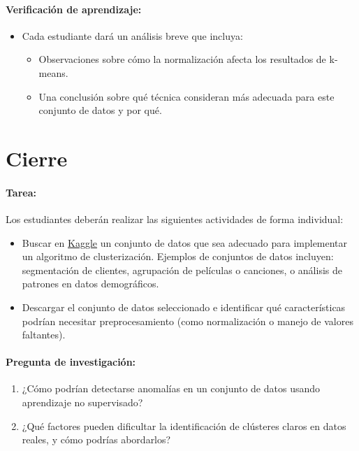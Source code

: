 \documentclass[a4,11pt]{aleph-notas}
\begin{document}
\paragraph{Verificación de aprendizaje:}  
\begin{itemize}[leftmargin=*]
    \item Cada estudiante dará un análisis breve que incluya:
        \begin{itemize}
            \item Observaciones sobre cómo la normalización afecta los resultados de k-means.
            \item Una conclusión sobre qué técnica consideran más adecuada para este conjunto de datos y por qué.
        \end{itemize}
\end{itemize}



\section*{Cierre}

\paragraph{Tarea:}  
Los estudiantes deberán realizar las siguientes actividades de forma individual:
\begin{itemize}[leftmargin=*]
    \item Buscar en \href{https://www.kaggle.com/}{Kaggle} un conjunto de datos que sea adecuado para implementar un algoritmo de clusterización. Ejemplos de conjuntos de datos incluyen: segmentación de clientes, agrupación de películas o canciones, o análisis de patrones en datos demográficos.
    \item Descargar el conjunto de datos seleccionado e identificar qué características podrían necesitar preprocesamiento (como normalización o manejo de valores faltantes).
\end{itemize}

\paragraph{Pregunta de investigación:}  
\begin{enumerate}[leftmargin=*]
    \item ¿Cómo podrían detectarse anomalías en un conjunto de datos usando aprendizaje no supervisado?
    \item ¿Qué factores pueden dificultar la identificación de clústeres claros en datos reales, y cómo podrías abordarlos?
\end{enumerate}
    
\end{document}
